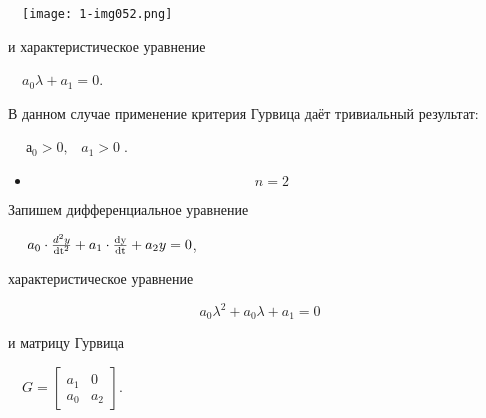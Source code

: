 \documentclass[a4paper]{article}
\newcommand\liststyleWWviiiNumlxxviii{%
\renewcommand\theenumi{\arabic{enumi}}
\renewcommand\theenumii{\arabic{enumii}}
\renewcommand\theenumiii{\arabic{enumiii}}
\renewcommand\labelitemi{}
\renewcommand\labelenumi{\theenumi.}
\renewcommand\labelenumii{\theenumii.}
\renewcommand\labelenumiii{\theenumiii.}
}
\newcommand\normalsubformula[1]{\text{\mathversion{normal}$#1$}}
\begin{document}
{\begin{russian}\sffamily
\ \  \texttt{[image: 1-img052.png]} 
\end{russian}}

{\begin{russian}\sffamily
и характеристическое уравнение
\end{russian}}

{\begin{russian}\sffamily
\ \  $a_0λ+a_1=0$.
\end{russian}}

{\begin{russian}\sffamily
В данном случае применение критерия Гурвица даёт тривиальный результат:
\end{russian}}

{\begin{russian}\sffamily
\ \  $\;а_0>0,\;\;\;a_1>0\;$.
\end{russian}}

\liststyleWWviiiNumlxxviii
\begin{itemize}
\item \begin{equation*}
n=2
\end{equation*}
\end{itemize}
{\begin{russian}\sffamily
Запишем дифференциальное уравнение
\end{russian}}


\bigskip

{\begin{russian}\sffamily
\ \  $\text{  }a_0\cdot \frac{d^2y}{\normalsubformula{\text{dt}}^2}+a_1\cdot
\frac{\normalsubformula{\text{dy}}}{\normalsubformula{\text{dt}}}+a_2y=0$,
\end{russian}}

{\begin{russian}\sffamily
характеристическое уравнение
\end{russian}}

\begin{equation*}
a_0λ^2+a_0λ+a_1=0
\end{equation*}
{\begin{russian}\sffamily
и матрицу Гурвица
\end{russian}}

{\begin{russian}\sffamily
\ \  $G=\left[\begin{matrix}a_1&0\\a_0&a_2\end{matrix}\right]$.
\end{russian}}
\end{document}
